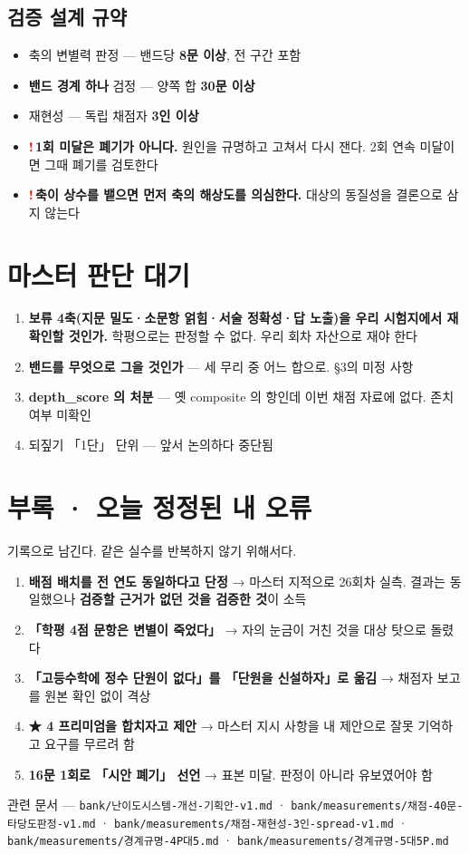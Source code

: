 \documentclass[11pt]{article}
\newcommand{\R}{\textcolor{red}{\textbf{!}}\,}
\begin{document}
\subsection{검증 설계 규약}

\begin{itemize}
\item 축의 변별력 판정 — 밴드당 \textbf{8문 이상}, 전 구간 포함
\item \textbf{밴드 경계 하나} 검정 — 양쪽 합 \textbf{30문 이상}
\item 재현성 — 독립 채점자 \textbf{3인 이상}
\item \R \textbf{1회 미달은 폐기가 아니다.} 원인을 규명하고 고쳐서 다시 잰다. 2회 연속 미달이면 그때 폐기를 검토한다
\item \R \textbf{축이 상수를 뱉으면 먼저 축의 해상도를 의심한다.} 대상의 동질성을 결론으로 삼지 않는다
\end{itemize}

\section{마스터 판단 대기}

\begin{enumerate}
\item \textbf{보류 4축(지문 밀도·소문항 얽힘·서술 정확성·답 노출)을 우리 시험지에서 재확인할 것인가.}
학평으로는 판정할 수 없다. 우리 회차 자산으로 재야 한다
\item \textbf{밴드를 무엇으로 그을 것인가} — 세 무리 중 어느 합으로. \S3의 미정 사항
\item \textbf{depth\_score 의 처분} — 옛 composite 의 항인데 이번 채점 자료에 없다. 존치 여부 미확인
\item 되짚기 「1단」 단위 — 앞서 논의하다 중단됨
\end{enumerate}

\section*{부록 · 오늘 정정된 내 오류}

기록으로 남긴다. 같은 실수를 반복하지 않기 위해서다.

\begin{enumerate}
\item \textbf{배점 배치를 전 연도 동일하다고 단정} → 마스터 지적으로 26회차 실측. 결과는 동일했으나
\textbf{검증할 근거가 없던 것을 검증한 것}이 소득
\item \textbf{「학평 4점 문항은 변별이 죽었다」} → 자의 눈금이 거친 것을 대상 탓으로 돌렸다
\item \textbf{「고등수학에 정수 단원이 없다」를 「단원을 신설하자」로 옮김} → 채점자 보고를 원본 확인 없이 격상
\item \textbf{★ 4 프리미엄을 합치자고 제안} → 마스터 지시 사항을 내 제안으로 잘못 기억하고 요구를 무르려 함
\item \textbf{16문 1회로 「시안 폐기」 선언} → 표본 미달. 판정이 아니라 유보였어야 함
\end{enumerate}

\vspace{3mm}
{\color{gray}\small 관련 문서 — \texttt{bank/난이도시스템-개선-기획안-v1.md} ·
\texttt{bank/measurements/채점-40문-타당도판정-v1.md} ·
\texttt{bank/measurements/채점-재현성-3인-spread-v1.md} ·
\texttt{bank/measurements/경계규명-4P대5.md} · \texttt{bank/measurements/경계규명-5대5P.md}}
\end{document}
